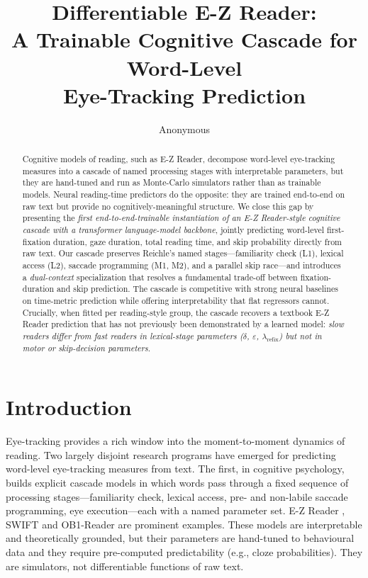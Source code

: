 \documentclass[11pt]{article}
\title{\textbf{Differentiable E-Z Reader:\\
A Trainable Cognitive Cascade for Word-Level\\
Eye-Tracking Prediction}}
\author{Anonymous}
\date{}
\begin{document}
\maketitle

\begin{abstract}
\noindent
Cognitive models of reading, such as E-Z Reader, decompose word-level eye-tracking measures into a cascade of named processing stages with interpretable parameters, but they are hand-tuned and run as Monte-Carlo simulators rather than as trainable models. Neural reading-time predictors do the opposite: they are trained end-to-end on raw text but provide no cognitively-meaningful structure. We close this gap by presenting the \emph{first end-to-end-trainable instantiation of an E-Z Reader-style cognitive cascade with a transformer language-model backbone}, jointly predicting word-level first-fixation duration, gaze duration, total reading time, and skip probability directly from raw text. Our cascade preserves Reichle's named stages---familiarity check (L1), lexical access (L2), saccade programming (M1, M2), and a parallel skip race---and introduces a \emph{dual-context} specialization that resolves a fundamental trade-off between fixation-duration and skip prediction. The cascade is competitive with strong neural baselines on time-metric prediction while offering interpretability that flat regressors cannot. Crucially, when fitted per reading-style group, the cascade recovers a textbook E-Z Reader prediction that has not previously been demonstrated by a learned model: \emph{slow readers differ from fast readers in lexical-stage parameters ($\delta$, $\varepsilon$, $\lambda_{\text{refix}}$) but not in motor or skip-decision parameters}.
\end{abstract}

\section{Introduction}\label{sec:intro}

Eye-tracking provides a rich window into the moment-to-moment dynamics of reading. Two largely disjoint research programs have emerged for predicting word-level eye-tracking measures from text. The first, in cognitive psychology, builds explicit cascade models in which words pass through a fixed sequence of processing stages---familiarity check, lexical access, pre- and non-labile saccade programming, eye execution---each with a named parameter set. E-Z Reader \citep{reichle2003ezreader,reichle2009ezreader}, SWIFT \citep{engbert2005swift} and OB1-Reader \citep{snell2018ob1} are prominent examples. These models are interpretable and theoretically grounded, but their parameters are hand-tuned to behavioural data and they require pre-computed predictability (e.g., cloze probabilities). They are simulators, not differentiable functions of raw text.
\end{document}
